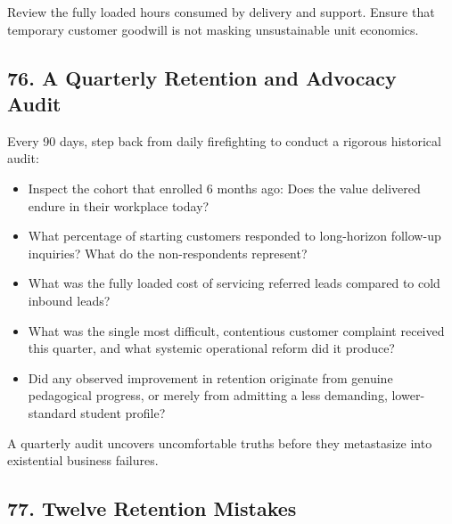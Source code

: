 Review the fully loaded hours consumed by delivery and support. Ensure that temporary customer goodwill is not masking unsustainable unit economics.

\subsection*{76. A Quarterly Retention and Advocacy Audit}

Every 90 days, step back from daily firefighting to conduct a rigorous historical audit:
\begin{itemize}[leftmargin=*]
\item Inspect the cohort that enrolled 6 months ago: Does the value delivered endure in their workplace today?
\item What percentage of starting customers responded to long-horizon follow-up inquiries? What do the non-respondents represent?
\item What was the fully loaded cost of servicing referred leads compared to cold inbound leads?
\item What was the single most difficult, contentious customer complaint received this quarter, and what systemic operational reform did it produce?
\item Did any observed improvement in retention originate from genuine pedagogical progress, or merely from admitting a less demanding, lower-standard student profile?
\end{itemize}

A quarterly audit uncovers uncomfortable truths before they metastasize into existential business failures.

\subsection*{77. Twelve Retention Mistakes}


